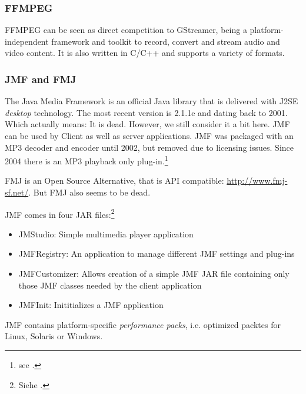 \subsubsection{FFMPEG}%
\label{sec:FFMPEG}%

FFMPEG can be seen as direct competition to GStreamer, being a platform-independent framework and toolkit to record, convert and stream audio and video content. It is also written in C/C++ and supports a variety of formats. 


\subsubsection{JMF and FMJ}
\label{sec:JMF}

The Java Media Framework is an official Java library that is delivered with J2SE \emph{desktop} technology. The most recent version is 2.1.1e and dating back to 2001. Which actually means: It is dead. However, we still consider it a bit here. JMF can be used by Client as well as server applications. JMF was packaged with an MP3 decoder and encoder until 2002, but removed due to licensing issues. Since 2004 there is an MP3 playback only plug-in.\footnote{see \cite{WikJMF}.}

FMJ is an Open Source Alternative, that is API compatible: \url{http://www.fmj-sf.net/}. But FMJ also seems to be dead.

JMF comes in four JAR files:\footnote{Siehe \cite{WikJMF}.}
\begin{itemize}
\item JMStudio: Simple multimedia player application
\item JMFRegistry: An application to manage different JMF settings and plug-ins
\item JMFCustomizer: Allows creation of a simple JMF JAR file containing only those JMF classes needed by the client application
\item JMFInit: Inititializes a JMF application
\end{itemize}

JMF contains platform-specific \emph{performance packs}, i.e. optimized packtes for Linux, Solaris or Windows.


